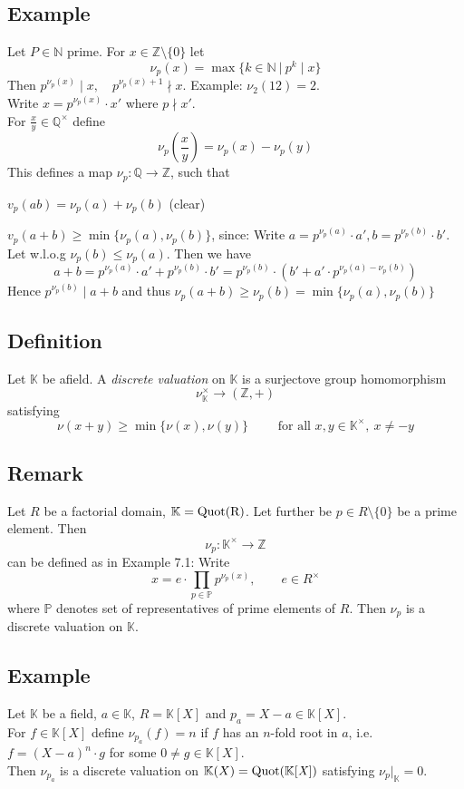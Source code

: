 \documentclass[12pt]{book}
\begin{document}
\begin{spacing}{1.3}
\subsection{Example} %
Let $P \in \mathbb{N}$ prime. For $x \in \mathbb{Z}\setminus \{0\}$ let 
$$\nu_p(x)=\max\{k \in \mathbb{N} \ \big\vert\ p^k \mid x \}$$
Then $p^{\nu_p(x)} \mid x, \quad p^{\nu_p(x)+1} \nmid x$. Example: $\nu_2(12)=2$.\\
Write $x=p^{\nu_p(x)} \cdot x'$ where $p \nmid x'$.\\
For $\frac{x}{y} \in \mathbb{Q}^{\times}$ define
$$\nu_p\left(\frac{x}{y}\right)=\nu_p(x)-\nu_p(y)$$
This defines a map $\nu_p: \mathbb{Q} \longrightarrow \mathbb{Z}$, such that
\begin{compactenum}
\item $v_p(ab)=\nu_p(a)+\nu_p(b)$ (clear)
\item $v_p(a+b) \geqslant \min\{\nu_p(a), \nu_p(b)\}$, since:
Write $a=p^{\nu_p(a)} \cdot a', b=p^{\nu_p(b)}\cdot b'$. Let w.l.o.g $\nu_p(b) \leqslant \nu_p(a)$. Then we have
$$a+b=p^{\nu_p(a)} \cdot a' + p^{\nu_p(b)} \cdot b'=p^{\nu_p(b)} \cdot \left(b'+a' \cdot p^{\nu_p(a)-\nu_p(b)}\right)$$
Hence $p^{\nu_p(b)} \mid a+b$ and thus $\nu_p(a+b) \geqslant \nu_p(b)=\min\{\nu_p(a), \nu_p(b)\}$
\end{compactenum}

\subsection{Definition} %
Let $\mathbb{K}$ be afield. A \textit{discrete valuation} on $\mathbb{K}$ is a surjectove group homomorphism
$$\nu_ \mathbb{K}^{\times} \longrightarrow (\mathbb{Z},+)$$
satisfying
$$\nu(x+y) \geqslant \min\{\nu(x), \nu(y)\} \qquad \textrm{ for all } x,y \in \mathbb{K}^{\times}, \ x \neq -y$$

\subsection{Remark} %
Let $R$ be a factorial domain, $\mathbb{K}=\rm{Quot}(R)$. Let further be $p \in R \setminus \{0\}$ be a prime element. Then 
$$\nu_p: \mathbb{K}^{\times} \longrightarrow \mathbb{Z}$$ can be defined as in Example 7.1: Write
$$x=e \cdot \prod_{p \in \mathbb{P}} p^{\nu_p(x)}, \qquad e\in R^{\times}$$
where $\mathbb{P}$ denotes set of representatives of prime elements of $R$. Then $\nu_p$ is a discrete valuation on $\mathbb{K}$.

\subsection{Example} %
Let $\mathbb{K}$ be a field, $a \in \mathbb{K}$, $R=\mathbb{K}[X]$ and $p_a=X-a \in \mathbb{K}[X]$.\\
For $f \in \mathbb{K}[X]$ define $\nu_{p_a}(f)=n$ if $f$ has an $n$-fold root in $a$, i.e. $f=(X-a)^n \cdot g$ for some $0 \neq g \in \mathbb{K}[X]$.\\
Then $\nu_{p_a}$ is a discrete valuation on $\mathbb{K}(X)=\rm{Quot}(\mathbb{K}[\mathit{X}])$ satisfying $\nu_p |_{\mathbb{K}}=0$.


\end{spacing}
\end{document}
